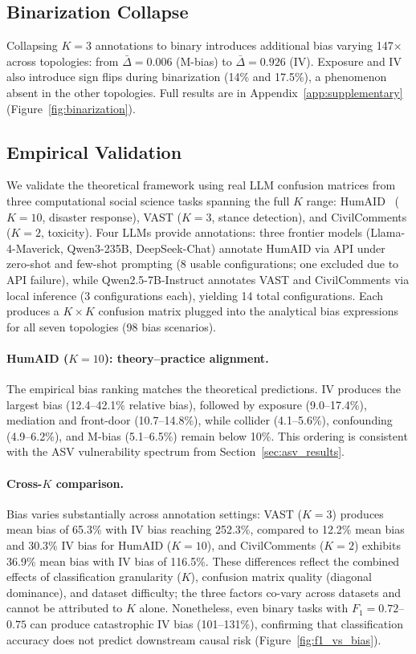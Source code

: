 \subsection{Binarization Collapse}
\label{sec:binarization}

Collapsing $K{=}3$ annotations to binary introduces additional bias varying 147$\times$ across topologies: from $\bar{\Delta}{=}0.006$ (M-bias) to $\bar{\Delta}{=}0.926$ (IV). Exposure and IV also introduce sign flips during binarization (14\% and 17.5\%), a phenomenon absent in the other topologies. Full results are in Appendix~\ref{app:supplementary} (Figure~\ref{fig:binarization}).

\subsection{Empirical Validation}
\label{sec:empirical}

We validate the theoretical framework using real LLM confusion matrices from three computational social science tasks spanning the full $K$ range: HumAID~\cite{alam2021humaid} ($K{=}10$, disaster response), VAST ($K{=}3$, stance detection), and CivilComments ($K{=}2$, toxicity). Four LLMs provide annotations: three frontier models (Llama-4-Maverick, Qwen3-235B, DeepSeek-Chat) annotate HumAID via API under zero-shot and few-shot prompting (8 usable configurations; one excluded due to API failure), while Qwen2.5-7B-Instruct annotates VAST and CivilComments via local inference (3 configurations each), yielding 14 total configurations. Each produces a $K{\times}K$ confusion matrix plugged into the analytical bias expressions for all seven topologies (98 bias scenarios).

\paragraph{HumAID ($K{=}10$): theory--practice alignment.}
The empirical bias ranking matches the theoretical predictions. IV produces the largest bias (12.4--42.1\% relative bias), followed by exposure (9.0--17.4\%), mediation and front-door (10.7--14.8\%), while collider (4.1--5.6\%), confounding (4.9--6.2\%), and M-bias (5.1--6.5\%) remain below 10\%. This ordering is consistent with the ASV vulnerability spectrum from Section~\ref{sec:asv_results}.

\paragraph{Cross-$K$ comparison.}
Bias varies substantially across annotation settings: VAST ($K{=}3$) produces mean bias of 65.3\% with IV bias reaching 252.3\%, compared to 12.2\% mean bias and 30.3\% IV bias for HumAID ($K{=}10$), and CivilComments ($K{=}2$) exhibits 36.9\% mean bias with IV bias of 116.5\%. These differences reflect the combined effects of classification granularity ($K$), confusion matrix quality (diagonal dominance), and dataset difficulty; the three factors co-vary across datasets and cannot be attributed to $K$ alone. Nonetheless, even binary tasks with $F_1{=}0.72$--$0.75$ can produce catastrophic IV bias (101--131\%), confirming that classification accuracy does not predict downstream causal risk (Figure~\ref{fig:f1_vs_bias}).

